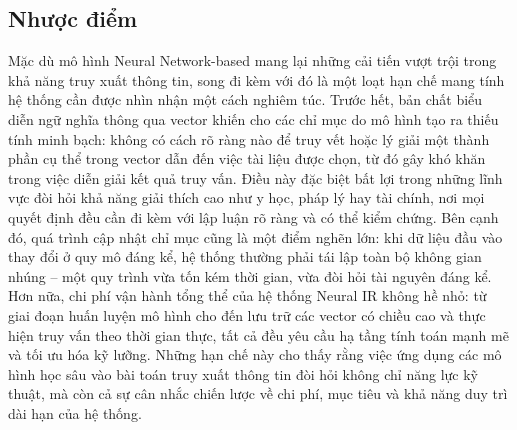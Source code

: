 \subsection{Nhược điểm}
Mặc dù mô hình Neural Network-based mang lại những cải tiến vượt trội trong khả năng truy xuất thông tin, song đi kèm với đó là một loạt hạn chế mang tính hệ thống cần được nhìn nhận một cách nghiêm túc. Trước hết, bản chất biểu diễn ngữ nghĩa thông qua vector khiến cho các chỉ mục do mô hình tạo ra thiếu tính minh bạch: không có cách rõ ràng nào để truy vết hoặc lý giải một thành phần cụ thể trong vector dẫn đến việc tài liệu được chọn, từ đó gây khó khăn trong việc diễn giải kết quả truy vấn. Điều này đặc biệt bất lợi trong những lĩnh vực đòi hỏi khả năng giải thích cao như y học, pháp lý hay tài chính, nơi mọi quyết định đều cần đi kèm với lập luận rõ ràng và có thể kiểm chứng. Bên cạnh đó, quá trình cập nhật chỉ mục cũng là một điểm nghẽn lớn: khi dữ liệu đầu vào thay đổi ở quy mô đáng kể, hệ thống thường phải tái lập toàn bộ không gian nhúng -- một quy trình vừa tốn kém thời gian, vừa đòi hỏi tài nguyên đáng kể. Hơn nữa, chi phí vận hành tổng thể của hệ thống Neural IR không hề nhỏ: từ giai đoạn huấn luyện mô hình cho đến lưu trữ các vector có chiều cao và thực hiện truy vấn theo thời gian thực, tất cả đều yêu cầu hạ tầng tính toán mạnh mẽ và tối ưu hóa kỹ lưỡng. Những hạn chế này cho thấy rằng việc ứng dụng các mô hình học sâu vào bài toán truy xuất thông tin đòi hỏi không chỉ năng lực kỹ thuật, mà còn cả sự cân nhắc chiến lược về chi phí, mục tiêu và khả năng duy trì dài hạn của hệ thống.

